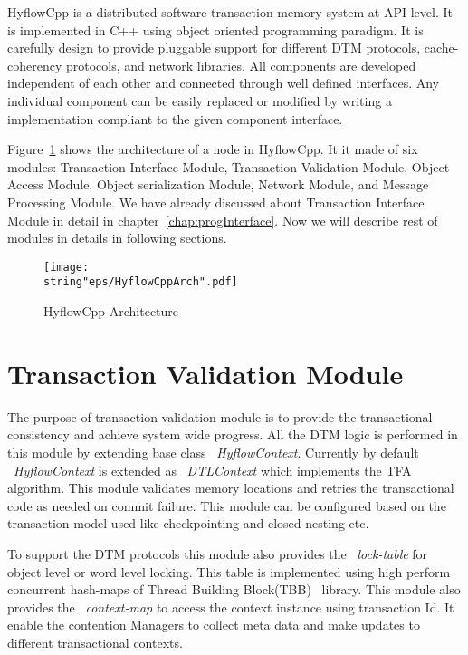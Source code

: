 \documentclass[12pt,english]{report}
\begin{document}
HyflowCpp is a distributed software transaction memory system at API level. It is implemented in C++ using object oriented programming paradigm. It is carefully design to provide pluggable support for different DTM protocols, cache-coherency protocols, and network libraries. All components are developed independent of each other and connected through well defined interfaces. Any individual component can be easily replaced or modified by writing a implementation compliant to the given component interface. 

Figure~\ref{Fig:HyflowCppArch} shows the architecture of a node in HyflowCpp. It it made of six modules: Transaction Interface Module, Transaction Validation Module, Object Access Module, Object serialization Module, Network Module, and Message Processing Module. We have already discussed about Transaction Interface Module in detail in chapter~\ref{chap:progInterface}. Now we will describe rest of modules in details in following sections.

\begin{figure}
\begin{minipage}[b]{0.9\linewidth}\centering
\centering \texttt{[image: \\string"eps/HyflowCppArch".pdf]}
\caption{HyflowCpp Architecture}
\label{Fig:HyflowCppArch}
\end{minipage}
\end{figure}

\section{Transaction Validation Module}

The purpose of transaction validation module is to provide the transactional consistency and achieve system wide progress. All the DTM logic is performed in this module by extending base class ~\emph{HyflowContext}. Currently by default ~\emph{HyflowContext} is extended as ~\emph{DTLContext} which implements the TFA algorithm. This module validates memory locations and retries the transactional code as needed on commit failure. This module can be configured based on the transaction model used like checkpointing and closed nesting etc. 

To support the DTM protocols this module also provides the ~\emph{lock-table} for object level or word level locking. This table is implemented using high perform concurrent hash-maps of Thread Building Block(TBB)~\cite{willhalm2008putting} library. This module also provides the ~\emph{context-map} to access the context instance using transaction Id. It enable the contention Managers to collect meta data and make updates to different transactional contexts.
\end{document}
